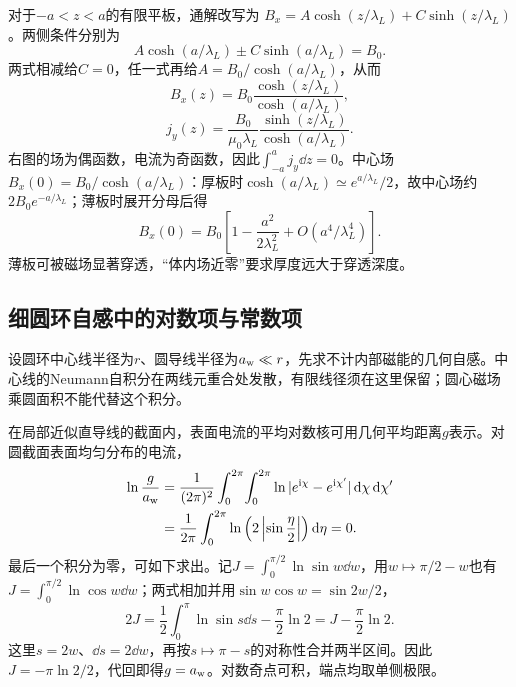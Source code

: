 \begin{solution}
对于$-a<z<a$的有限平板，通解改写为
$B_x=A\cosh(z/\lambda_L)+C\sinh(z/\lambda_L)$。两侧条件分别为
\[
A\cosh(a/\lambda_L)\pm C\sinh(a/\lambda_L)=B_0.
\]
两式相减给$C=0$，任一式再给$A=B_0/\cosh(a/\lambda_L)$，从而
\[
\boxed{B_x(z)=B_0\frac{\cosh(z/\lambda_L)}{\cosh(a/\lambda_L)}},
\]
\[
j_y(z)=\frac{B_0}{\mu_0\lambda_L}
\frac{\sinh(z/\lambda_L)}{\cosh(a/\lambda_L)}.
\]
右图的场为偶函数，电流为奇函数，因此$\int_{-a}^aj_y\dd z=0$。中心场$B_x(0)=B_0/\cosh(a/\lambda_L)$：厚板时$\cosh(a/\lambda_L)\simeq e^{a/\lambda_L}/2$，故中心场约$2B_0e^{-a/\lambda_L}$；薄板时展开分母后得
\[
B_x(0)=B_0\left[1-\frac{a^2}{2\lambda_L^2}
+O(a^4/\lambda_L^4)\right].
\]
薄板可被磁场显著穿透，“体内场近零”要求厚度远大于穿透深度。
\end{solution}

\subsection{细圆环自感中的对数项与常数项}\label{sec:i3-thin-ring}
设圆环中心线半径为$r$、圆导线半径为$a_{\rm w}\ll r$，先求不计内部磁能的几何自感。中心线的Neumann自积分在两线元重合处发散，有限线径须在这里保留；圆心磁场乘圆面积不能代替这个积分。

在局部近似直导线的截面内，表面电流的平均对数核可用几何平均距离$g$表示。对圆截面表面均匀分布的电流，
\[\begin{aligned}
\ln\frac g{a_{\rm w}}&=\frac1{(2\pi)^2}\int_0^{2\pi}\!\int_0^{2\pi}
\ln|e^{\mathrm i\chi}-e^{\mathrm i\chi'}|
\mathop{}\!\mathrm d\chi\mathop{}\!\mathrm d\chi'\\
&=\frac1{2\pi}\int_0^{2\pi}
\ln\left(2\left|\sin\frac\eta2\right|\right)\mathop{}\!\mathrm d\eta
=0.
\end{aligned}\]
最后一个积分为零，可如下求出。记$J=\int_0^{\pi/2}\ln\sin w\dd w$，用$w\mapsto\pi/2-w$也有$J=\int_0^{\pi/2}\ln\cos w\dd w$；两式相加并用$\sin w\cos w=\sin2w/2$，
\[2J=\frac12\int_0^\pi\ln\sin s\dd s-\frac\pi2\ln2
=J-\frac\pi2\ln2.
\]
这里$s=2w$、$\dd s=2\dd w$，再按$s\mapsto\pi-s$的对称性合并两半区间。因此$J=-\pi\ln2/2$，代回即得$g=a_{\rm w}$。对数奇点可积，端点均取单侧极限。

